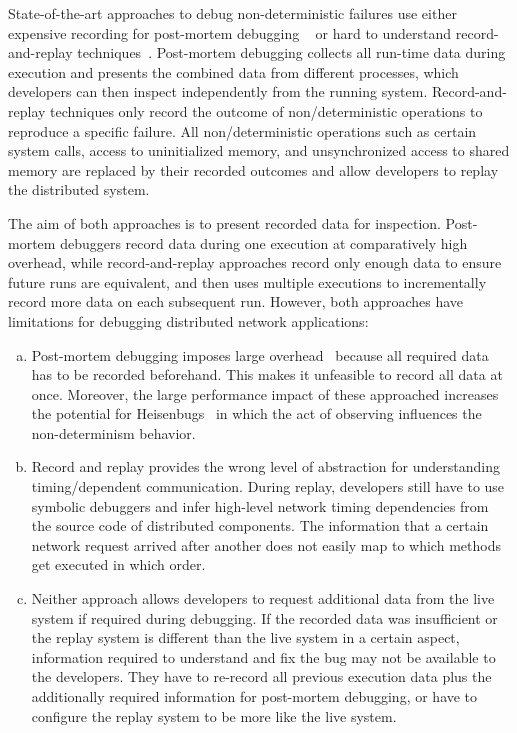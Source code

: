 \documentclass[preprint,3p]{elsarticle}
\begin{document}
State-of-the-art approaches to debug non-deterministic failures
use either expensive recording for post-mortem debugging
~\cite{Stanley2009} or hard to understand record-and-replay 
techniques~\cite{Geels2006Replay}. Post-mortem debugging
collects all run-time data during execution and presents the combined
data from different processes, which developers can then inspect
independently from the running system. Record-and-replay techniques
only record the outcome of non\-/deterministic operations to reproduce 
a specific failure. All non\-/deterministic operations such as certain 
system calls, access to uninitialized memory, and unsynchronized 
access to shared memory are replaced by their recorded outcomes 
and allow developers to replay the distributed system. 

The aim of both approaches is to present recorded data for
inspection. Post-mortem debuggers record data during one execution at
comparatively high overhead, while record-and-replay approaches record only
enough data to ensure future runs are equivalent, and then uses multiple
executions to incrementally record more data on each subsequent run. However,
both approaches have limitations for debugging distributed network applications:

\begin{enumerate}[(a)]
\item Post-mortem debugging imposes large overhead~\cite{Stanley2009}
  because all required data has to be recorded beforehand. This makes
  it unfeasible to record all data at once. Moreover, the large
  performance impact of these approached increases the potential for
  Heisenbugs~\cite{zeller2009programs} in which the act of observing
  influences the non-determinism behavior.
\item Record and replay provides the wrong level of abstraction for
  understanding timing\-/dependent communication. During replay,
  developers still have to use symbolic debuggers and infer high-level
  network timing dependencies from the source code of distributed
  components. The information that a certain network request arrived
  after another does not easily map to which methods get executed in
  which order.
\item Neither approach allows developers to request additional data
  from the live system if required during debugging. If the recorded
  data was insufficient or the replay system is different than the
  live system in a certain aspect, information required to understand
  and fix the bug may not be available to the developers. They have to
  re-record all previous execution data plus the additionally required
  information for post-mortem debugging, or have to configure the
  replay system to be more like the live system.
\end{enumerate}
\end{document}
